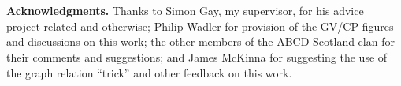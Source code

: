 \\~\\
{\bf Acknowledgments.} Thanks to Simon Gay, my supervisor, for his advice
project-related and otherwise; Philip Wadler for provision of the GV/CP
figures and discussions on this work; the other members of the ABCD Scotland
clan for their comments and suggestions; and James McKinna for suggesting the
use of the graph relation ``trick'' and other feedback on this work.
